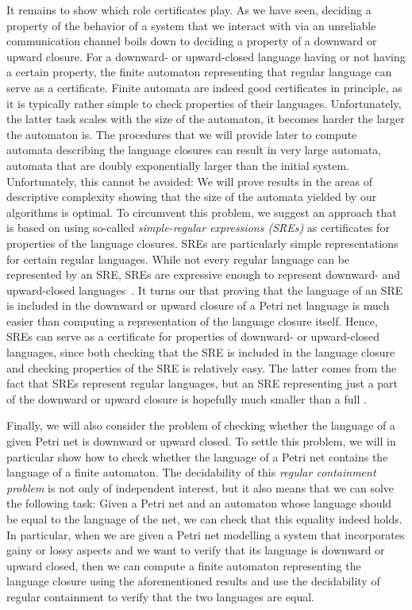 \documentclass[../../diss.tex]{subfiles}
\begin{document}
It remains to show which role certificates play.
As we have seen, deciding a property of the behavior of a system that we interact with via an unreliable communication channel boils down to deciding a property of a downward or upward closure.
For a downward- or upward-closed language having or not having a certain property, the finite automaton representing that regular language can serve as a certificate.
Finite automata are indeed good certificates in principle, as it is typically rather simple to check properties of their languages.
Unfortunately, the latter task scales with the size of the automaton, \ie it becomes harder the larger the automaton is.
The procedures that we will provide later to compute automata describing the language closures can result in very large automata, \eg automata that are doubly exponentially larger than the initial system.
Unfortunately, this cannot be avoided:
We will prove results in the areas of descriptive complexity showing that the size of the automata yielded by our algorithms is optimal.
%
To circumvent this problem, we suggest an approach that is based on using so-called \emph{simple-regular expressions (SREs)} as certificates for properties of the language closures.
SREs are particularly simple representations for certain regular languages.
While not every regular language can be represented by an SRE, SREs are expressive enough to represent downward- and upward-closed languages~\cite{AbdullaCBJ04}.
It turns our that proving that the language of an SRE is included in the downward or upward closure of a Petri net language is much easier than computing a representation of the language closure itself.
Hence, SREs can serve as a certificate for properties of downward- or upward-closed languages, since both checking that the SRE is included in the language closure and checking properties of the SRE is relatively easy.
The latter comes from the fact that SREs represent regular languages, but an SRE representing just a part of the downward or upward closure is hopefully much smaller than a full .

Finally, we will also consider the problem of checking whether the language of a given Petri net is downward or upward closed.
To settle this problem, we will in particular show how to check whether the language of a Petri net contains the language of a finite automaton.
The decidability of this \emph{regular containment problem} is not only of independent interest, but it also means that we can solve the following task:
Given a Petri net and an automaton whose language should be equal to the language of the net, we can check that this equality indeed holds.
In particular, when we are given a Petri net modelling a system that incorporates gainy or lossy aspects and we want to verify that its language is downward or upward closed, then we can compute a finite automaton representing the language closure using the aforementioned results and use the decidability of regular containment to verify that the two languages are equal.
\end{document}
